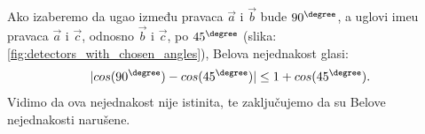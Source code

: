 Ako izaberemo da ugao između pravaca $\vec{a}$ i $\vec{b}$ bude $90^\degree$, a uglovi ime\dj u pravaca $\vec{a}$ i $\vec{c}$, odnosno $\vec{b}$ i $\vec{c}$, po $45^\degree$ (slika: \ref{fig:detectors_with_chosen_angles}), Belova nejednakost glasi:
\begin{equation*}
    | cos(90^\degree) - cos(45^\degree)|\le 1 + cos(45^\degree).
\end{equation*}
Vidimo da ova nejednakost nije istinita, te zaključujemo da su Belove nejednakosti narušene.

